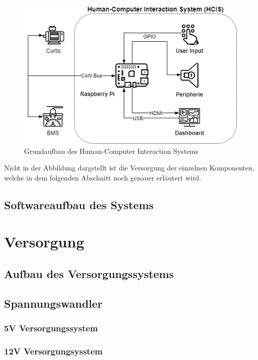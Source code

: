 \begin{figure}[H]
	\begin{center}
		\includegraphics[scale=0.5]{figures/hcis/HCIS_Grundfunktion.png}
		\caption{Grundaufbau des Human-Computer Interaction Systems}
	\end{center}
\end{figure}

Nicht in der Abbildung dargstellt ist die Versorgung der einzelnen Komponenten, welche in dem folgenden Abschnitt noch genauer erläutert wird.

\subsection{Softwareaufbau des Systems}

\newpage


\section{Versorgung}
\subsection{Aufbau des Versorgungssystems}
\subsection{Spannungswandler}
\subsubsection{5V Versorgungssystem}
\subsubsection{12V Versorgungsysstem}


